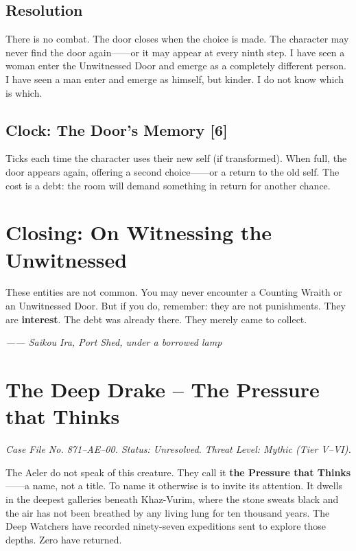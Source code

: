 \subsection{Resolution}

There is no combat. The door closes when the choice is made. The character may never find the door again------or it may appear at every ninth step. I have seen a woman enter the Unwitnessed Door and emerge as a completely different person. I have seen a man enter and emerge as himself, but kinder. I do not know which is which.

\subsection{Clock: The Door's Memory [6]}

Ticks each time the character uses their new self (if transformed). When full, the door appears again, offering a second choice------or a return to the old self. The cost is a debt: the room will demand something in return for another chance.

\section{Closing: On Witnessing the Unwitnessed}

These entities are not common. You may never encounter a Counting Wraith or an Unwitnessed Door. But if you do, remember: they are not punishments. They are \textbf{interest}. The debt was already there. They merely came to collect.

\emph{------ Saikou Ira, Port Shed, under a borrowed lamp}

\section{The Deep Drake -- The Pressure that Thinks}

\emph{Case File No. 871--AE--00. Status: Unresolved. Threat Level: Mythic (Tier V--VI).}

The Aeler do not speak of this creature. They call it \textbf{the Pressure that Thinks}------a name, not a title. To name it otherwise is to invite its attention. It dwells in the deepest galleries beneath Khaz-Vurim, where the stone sweats black and the air has not been breathed by any living lung for ten thousand years. The Deep Watchers have recorded ninety-seven expeditions sent to explore those depths. Zero have returned.

